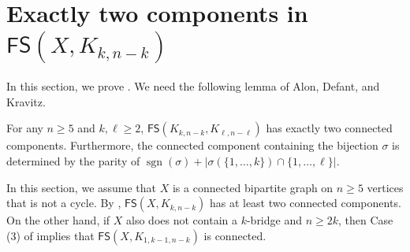 \documentclass{mystyle}
\newcommand{\FS}{\mathsf{FS}}
\begin{document}
\section{Exactly two components in $\FS(X, K_{k, n-k})$}\label{sec_two_comps}
In this section, we prove . We need the following lemma of Alon, Defant, and Kravitz.
\begin{lemma}\label{lem_two_components}
    For any $n \geq 5$ and $k, \ell \geq 2$, $\FS(K_{k, n - k}, K_{\ell, n - \ell})$ has exactly two connected components. Furthermore, the connected component containing the bijection $\sigma$ is determined by the parity of $\operatorname{sgn}(\sigma) + |\sigma(\{1, \ldots, k\}) \cap \{1, \ldots, \ell\}|$. 
\end{lemma}

In this section, we assume that $X$ is a connected bipartite graph on $n \geq 5$ vertices that is not a cycle. By , $\FS(X, K_{k, n - k})$ has at least two connected components. On the other hand, if $X$ also does not contain a $k$-bridge and  $n \geq 2k$, then Case (3) of  implies that $\FS(X, K_{1, k-1, n - k})$ is connected. 
\end{document}
